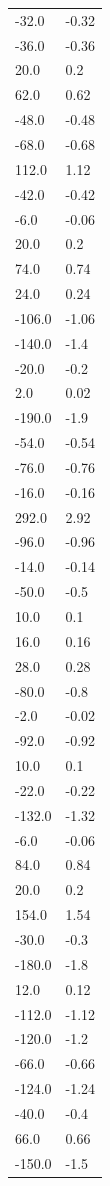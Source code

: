 \begin{longtable}{ll}
-32.0 & -0.32 \\
-36.0 & -0.36 \\
20.0 & 0.2 \\
62.0 & 0.62 \\
-48.0 & -0.48 \\
-68.0 & -0.68 \\
112.0 & 1.12 \\
-42.0 & -0.42 \\
-6.0 & -0.06 \\
20.0 & 0.2 \\
74.0 & 0.74 \\
24.0 & 0.24 \\
-106.0 & -1.06 \\
-140.0 & -1.4 \\
-20.0 & -0.2 \\
2.0 & 0.02 \\
-190.0 & -1.9 \\
-54.0 & -0.54 \\
-76.0 & -0.76 \\
-16.0 & -0.16 \\
292.0 & 2.92 \\
-96.0 & -0.96 \\
-14.0 & -0.14 \\
-50.0 & -0.5 \\
10.0 & 0.1 \\
16.0 & 0.16 \\
28.0 & 0.28 \\
-80.0 & -0.8 \\
-2.0 & -0.02 \\
-92.0 & -0.92 \\
10.0 & 0.1 \\
-22.0 & -0.22 \\
-132.0 & -1.32 \\
-6.0 & -0.06 \\
84.0 & 0.84 \\
20.0 & 0.2 \\
154.0 & 1.54 \\
-30.0 & -0.3 \\
-180.0 & -1.8 \\
12.0 & 0.12 \\
-112.0 & -1.12 \\
-120.0 & -1.2 \\
-66.0 & -0.66 \\
-124.0 & -1.24 \\
-40.0 & -0.4 \\
66.0 & 0.66 \\
-150.0 & -1.5 \\

\end{longtable}
